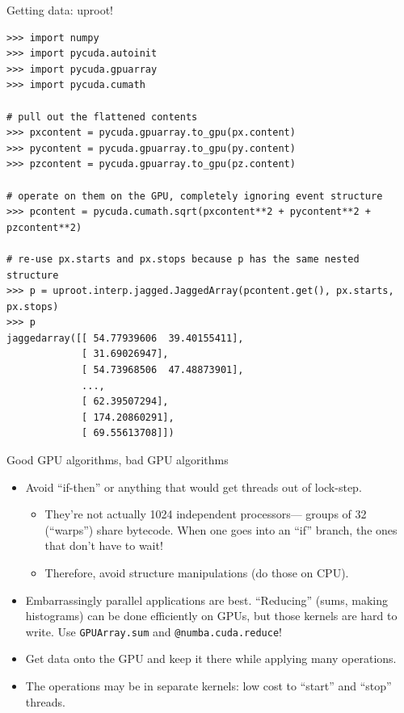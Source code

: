 \documentclass[aspectratio=169]{beamer}
\begin{document}
\begin{frame}[fragile]{Getting data: uproot!}
\vspace{0.1 cm}
\scriptsize
\begin{verbatim}
>>> import numpy
>>> import pycuda.autoinit
>>> import pycuda.gpuarray
>>> import pycuda.cumath

# pull out the flattened contents
>>> pxcontent = pycuda.gpuarray.to_gpu(px.content)
>>> pycontent = pycuda.gpuarray.to_gpu(py.content)
>>> pzcontent = pycuda.gpuarray.to_gpu(pz.content)

# operate on them on the GPU, completely ignoring event structure
>>> pcontent = pycuda.cumath.sqrt(pxcontent**2 + pycontent**2 + pzcontent**2)

# re-use px.starts and px.stops because p has the same nested structure
>>> p = uproot.interp.jagged.JaggedArray(pcontent.get(), px.starts, px.stops)
>>> p
jaggedarray([[ 54.77939606  39.40155411],
             [ 31.69026947],
             [ 54.73968506  47.48873901],
             ...,
             [ 62.39507294],
             [ 174.20860291],
             [ 69.55613708]])
\end{verbatim}
\end{frame}

\begin{frame}{Good GPU algorithms, bad GPU algorithms}
\vspace{0.5 cm}
\large
\begin{itemize}\setlength{\itemsep}{0.35 cm}
\item Avoid ``if-then'' or anything that would get threads out of lock-step.
\begin{itemize}
\item They're not actually 1024 independent processors--- groups of 32 (``warps'') share bytecode. When one goes into an ``if'' branch, the ones that don't have to wait!
\item Therefore, avoid structure manipulations (do those on CPU).
\end{itemize}

\item Embarrassingly parallel applications are best. ``Reducing'' (sums, making histograms) can be done efficiently on GPUs, but those kernels are hard to write. Use {\normalsize\tt GPUArray.sum} and {\normalsize\tt @numba.cuda.reduce}!

\item Get data onto the GPU and keep it there while applying many operations.

\item The operations may be in separate kernels: low cost to ``start'' and ``stop'' threads.
\end{itemize}
\end{frame}
\end{document}
